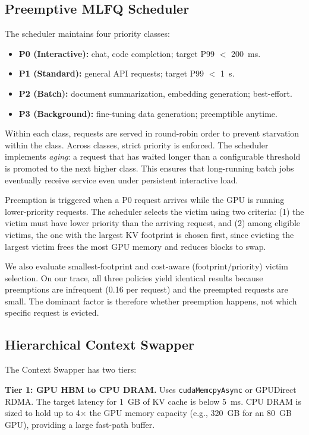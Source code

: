 \documentclass[conference]{IEEEtran}
\begin{document}
\subsection{Preemptive MLFQ Scheduler}

The scheduler maintains four priority classes:
\begin{itemize}
    \item \textbf{P0 (Interactive):} chat, code completion; target P99 $<$ 200~ms.
    \item \textbf{P1 (Standard):} general API requests; target P99 $<$ 1~s.
    \item \textbf{P2 (Batch):} document summarization, embedding generation; best-effort.
    \item \textbf{P3 (Background):} fine-tuning data generation; preemptible anytime.
\end{itemize}

Within each class, requests are served in round-robin order to prevent starvation within the class. Across classes, strict priority is enforced. The scheduler implements \emph{aging}: a request that has waited longer than a configurable threshold is promoted to the next higher class. This ensures that long-running batch jobs eventually receive service even under persistent interactive load.

Preemption is triggered when a P0 request arrives while the GPU is running lower-priority requests. The scheduler selects the victim using two criteria: (1) the victim must have lower priority than the arriving request, and (2) among eligible victims, the one with the largest KV footprint is chosen first, since evicting the largest victim frees the most GPU memory and reduces blocks to swap.

We also evaluate smallest-footprint and cost-aware ($\text{footprint} / \text{priority}$) victim selection. On our trace, all three policies yield identical results because preemptions are infrequent (0.16 per request) and the preempted requests are small. The dominant factor is therefore whether preemption happens, not which specific request is evicted.

\subsection{Hierarchical Context Swapper}

The Context Swapper has two tiers:

\textbf{Tier 1: GPU HBM to CPU DRAM.} Uses \texttt{cudaMemcpyAsync} or GPUDirect RDMA. The target latency for 1~GB of KV cache is below 5~ms. CPU DRAM is sized to hold up to 4$\times$ the GPU memory capacity (e.g., 320~GB for an 80~GB GPU), providing a large fast-path buffer.
\end{document}

